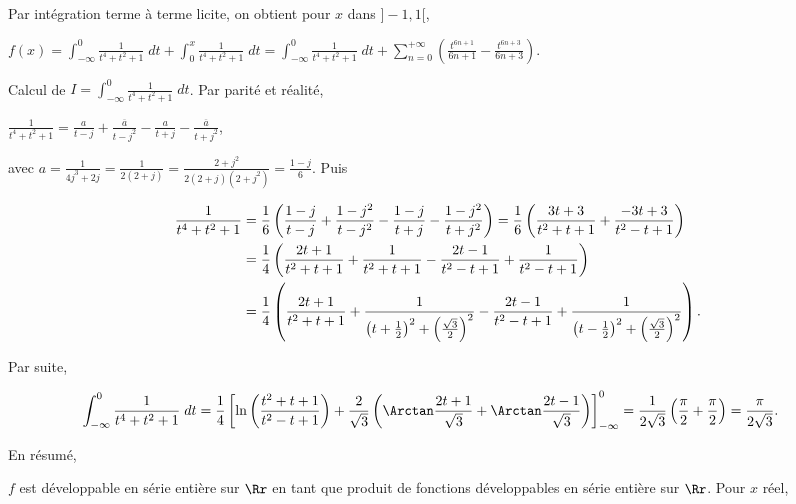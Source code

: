 {{Par intégration terme à terme licite, on obtient pour $x$ dans $]-1,1[$,

\begin{center}
$f(x)=\int_{-\infty}^{0}\frac{1}{t^4+t^2+1}\;dt+\int_{0}^{x}\frac{1}{t^4+t^2+1}\;dt=\int_{-\infty}^{0}\frac{1}{t^4+t^2+1}\;dt+\sum_{n=0}^{+\infty}\left(\frac{t^{6n+1}}{6n+1}-\frac{t^{6n+3}}{6n+3}\right)$.
\end{center}

Calcul de $I=\int_{-\infty}^{0}\frac{1}{t^4+t^2+1}\;dt$. Par parité et réalité,

\begin{center}
$\frac{1}{t^4+t^2+1}=\frac{a}{t-j}+\frac{\overline{a}}{t-j^2}-\frac{a}{t+j}-\frac{\overline{a}}{t+j^2}$,
\end{center}

avec $a=\frac{1}{4j^3+2j}=\frac{1}{2(2+j)}=\frac{2+j^2}{2(2+j)(2+j^2)}=\frac{1-j}{6}$.
Puis

\begin{align*}\ensuremath
\frac{1}{t^4+t^2+1}&=\frac{1}{6}\left(\frac{1-j}{t-j}+\frac{1-j^2}{t-j^2}-\frac{1-j}{t+j}-\frac{1-j^2}{t+j^2}\right)=\frac{1}{6}\left(\frac{3t+3}{t^2+t+1}+\frac{-3t+3}{t^2-t+1}\right)\\
 &=\frac{1}{4}\left(\frac{2t+1}{t^2+t+1}+\frac{1}{t^2+t+1}-\frac{2t-1}{t^2-t+1}+\frac{1}{t^2-t+1}\right)\\
 &=\frac{1}{4}\left(\frac{2t+1}{t^2+t+1}+\frac{1}{\left(t+\frac{1}{2}\right)^2+\left(\frac{\sqrt{3}}{2}\right)^2}-\frac{2t-1}{t^2-t+1}+\frac{1}{\left(t-\frac{1}{2}\right)^2+\left(\frac{\sqrt{3}}{2}\right)^2}\right).
\end{align*}

Par suite,

\begin{align*}\ensuremath
\int_{-\infty}^{0}\frac{1}{t^4+t^2+1}\;dt&=\frac{1}{4}\left[\ln\left(\frac{t^2+t+1}{t^2-t+1}\right)+\frac{2}{\sqrt{3}}\left(\Arctan\frac{2t+1}{\sqrt{3}}+\Arctan\frac{2t-1}{\sqrt{3}}\right)\right]_{-\infty}^0=\frac{1}{2\sqrt{3}}\left(\frac{\pi}{2}+\frac{\pi}{2}\right)=\frac{\pi}{2\sqrt{3}}.
\end{align*}

En résumé,

\begin{center}
\shadowbox{
$\forall x\in]-1,1[$, $\int_{-\infty}^{x}\frac{1}{t^4+t^2+1}\;dt=\frac{\pi}{2\sqrt{3}}+\sum_{n=0}^{+\infty}\left(\frac{t^{6n+1}}{6n+1}-\frac{t^{6n+3}}{6n+3}\right)$.
}
\end{center}
$f$ est développable en série entière sur $\Rr$ en tant que produit de fonctions développables en série entière sur $\Rr$. Pour $x$ réel,

}}
